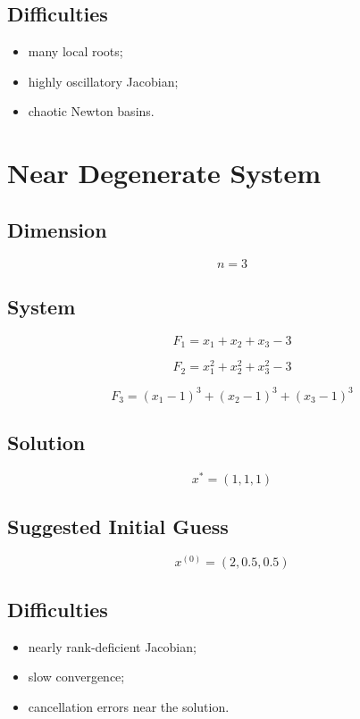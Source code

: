 \documentclass[11pt,a4paper]{article}
\begin{document}
\subsection*{Difficulties}

\begin{itemize}
  \item many local roots;
  \item highly oscillatory Jacobian;
  \item chaotic Newton basins.
\end{itemize}

\section{Near Degenerate System}

\subsection*{Dimension}

\[
n=3
\]

\subsection*{System}

\[
F_1=x_1+x_2+x_3-3
\]

\[
F_2=x_1^2+x_2^2+x_3^2-3
\]

\[
F_3=(x_1-1)^3+(x_2-1)^3+(x_3-1)^3
\]

\subsection*{Solution}

\[
x^*=(1,1,1)
\]

\subsection*{Suggested Initial Guess}

\[
x^{(0)}=(2,0.5,0.5)
\]

\subsection*{Difficulties}

\begin{itemize}
  \item nearly rank-deficient Jacobian;
  \item slow convergence;
  \item cancellation errors near the solution.
\end{itemize}
\end{document}
